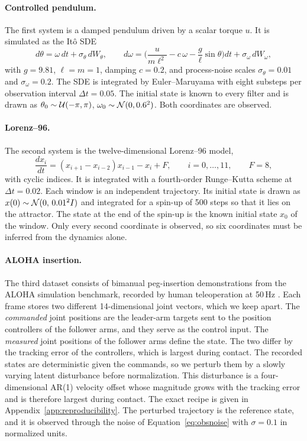 \paragraph{Controlled pendulum.}
The first system is a damped pendulum driven by a scalar torque $u$. It is simulated as the It\^o SDE
\begin{equation}\label{eq:pendulum}
 d\theta=\omega\,dt+\sigma_\theta\,dW_\theta,\qquad
 d\omega=\Big(\frac{u}{m\ell^{2}}-c\,\omega-\frac{g}{\ell}\sin\theta\Big)dt+\sigma_\omega\,dW_\omega,
\end{equation}
with $g=9.81$, $\ell=m=1$, damping $c=0.2$, and process-noise scales $\sigma_\theta=0.01$ and $\sigma_\omega=0.2$. The SDE is integrated by Euler--Maruyama with eight substeps per observation interval $\Delta t=0.05$. The initial state is known to every filter and is drawn as $\theta_0\sim\mathcal U(-\pi,\pi)$, $\omega_0\sim\mathcal N(0,0.6^{2})$. Both coordinates are observed. 

\paragraph{Lorenz--96.}
The second system is the twelve-dimensional Lorenz--96 model,
\begin{equation}\label{eq:lorenz96}
 \frac{dx_i}{dt}=(x_{i+1}-x_{i-2})x_{i-1}-x_i+F,
 \qquad i=0,\ldots,11,\qquad F=8,
\end{equation}
with cyclic indices. It is integrated with a fourth-order Runge--Kutta scheme at $\Delta t=0.02$. Each window is an independent trajectory. Its initial state is drawn as $x(0)\sim\mathcal N(0,\,0.01^{2}I)$ and integrated for a spin-up of 500 steps so that it lies on the attractor. The state at the end of the spin-up is the known initial state $x_0$ of the window. Only every second coordinate is observed, so six coordinates must be inferred from the dynamics alone. 

\paragraph{ALOHA insertion.}
The third dataset consists of bimanual peg-insertion demonstrations from the ALOHA simulation benchmark, recorded by human teleoperation at 50\,Hz \citep{zhao2023aloha}. Each frame stores two different 14-dimensional joint vectors, which we keep apart. The \emph{commanded} joint positions are the leader-arm targets sent to the position controllers of the follower arms, and they serve as the control input. The \emph{measured} joint positions of the follower arms define the state. The two differ by the tracking error of the controllers, which is largest during contact. The recorded states are deterministic given the commands, so we perturb them by a slowly varying latent disturbance before normalization. This disturbance is a four-dimensional AR(1) velocity offset whose magnitude grows with the tracking error and is therefore largest during contact. The exact recipe is given in Appendix~\ref{app:reproducibility}. The perturbed trajectory is the reference state, and it is observed through the noise of Equation~\eqref{eq:obsnoise} with $\sigma=0.1$ in normalized units. 

